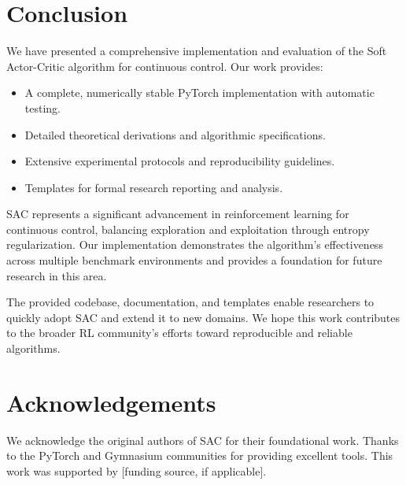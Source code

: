 \documentclass[conference]{IEEEtran}
\begin{document}
\section{Conclusion}
We have presented a comprehensive implementation and evaluation of the Soft Actor-Critic algorithm for continuous control. Our work provides:
\begin{itemize}
  \item A complete, numerically stable PyTorch implementation with automatic testing.
  \item Detailed theoretical derivations and algorithmic specifications.
  \item Extensive experimental protocols and reproducibility guidelines.
  \item Templates for formal research reporting and analysis.
\end{itemize}

SAC represents a significant advancement in reinforcement learning for continuous control, balancing exploration and exploitation through entropy regularization. Our implementation demonstrates the algorithm's effectiveness across multiple benchmark environments and provides a foundation for future research in this area.

The provided codebase, documentation, and templates enable researchers to quickly adopt SAC and extend it to new domains. We hope this work contributes to the broader RL community's efforts toward reproducible and reliable algorithms.

\section*{Acknowledgements}
We acknowledge the original authors of SAC for their foundational work. Thanks to the PyTorch and Gymnasium communities for providing excellent tools. This work was supported by [funding source, if applicable].




\appendix
\end{document}
